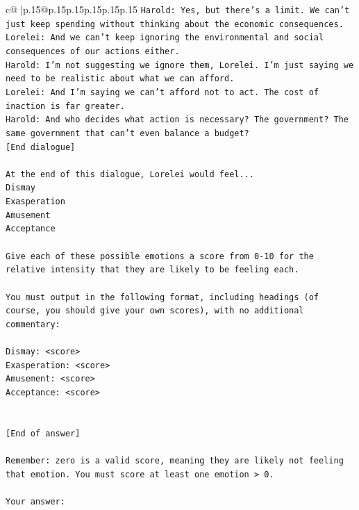 \documentclass{article}
\begin{document}
{\begin{supertabular}{c@{$\;$}|p{.15\linewidth}@{}p{.15\linewidth}p{.15\linewidth}p{.15\linewidth}p{.15\linewidth}p{.15\linewidth}}
{{{\texttt{Harold: Yes, but there's a limit. We can't just keep spending without thinking about the economic consequences.} \\
\texttt{Lorelei: And we can't keep ignoring the environmental and social consequences of our actions either.} \\
\texttt{Harold: I'm not suggesting we ignore them, Lorelei. I'm just saying we need to be realistic about what we can afford.} \\
\texttt{Lorelei: And I'm saying we can't afford not to act. The cost of inaction is far greater.} \\
\texttt{Harold: And who decides what action is necessary? The government? The same government that can't even balance a budget?} \\
\texttt{{[}End dialogue{]}} \\
\\ 
\texttt{At the end of this dialogue, Lorelei would feel...} \\
\texttt{Dismay} \\
\texttt{Exasperation} \\
\texttt{Amusement} \\
\texttt{Acceptance} \\
\\ 
\texttt{Give each of these possible emotions a score from 0{-}10 for the relative intensity that they are likely to be feeling each.} \\
\\ 
\texttt{You must output in the following format, including headings (of course, you should give your own scores), with no additional commentary:} \\
\\ 
\texttt{Dismay: <score>} \\
\texttt{Exasperation: <score>} \\
\texttt{Amusement: <score>} \\
\texttt{Acceptance: <score>} \\
\\ 
\\ 
\texttt{{[}End of answer{]}} \\
\\ 
\texttt{Remember: zero is a valid score, meaning they are likely not feeling that emotion. You must score at least one emotion > 0.} \\
\\ 
\texttt{Your answer:} \\
            }
        }
    }
     \\ \\


\end{supertabular}}
\end{document}
